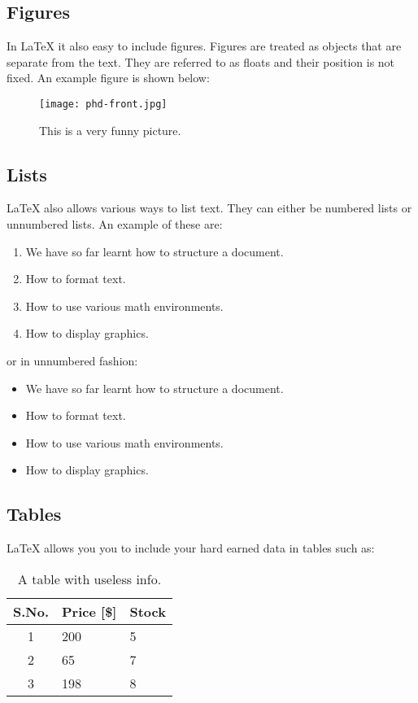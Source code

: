 \documentclass[a4paper,12pt]{article}
\begin{document}
\subsection{Figures}
In \LaTeX{} it also easy to include figures. Figures are treated as objects that are separate from the text. They are referred to as floats and their position is not fixed. An example figure is shown below:
\begin{figure}[htb]
\centering
\texttt{[image: phd-front.jpg]} %
\caption{This is a very funny picture.}
\label{fig:funnypic}
\end{figure}

\subsection{Lists}
\LaTeX{} also allows various ways to list text. They can either be numbered lists or unnumbered lists. An example of these are:
\begin{enumerate}
	\item We have so far learnt how to structure a document.
	\item How to format text.
	\item How to use various math environments.
	\item How to display graphics.
\end{enumerate}
or in unnumbered fashion:
\begin{itemize}
	\item We have so far learnt how to structure a document.
	\item How to format text.
	\item How to use various math environments.
	\item How to display graphics.
\end{itemize}

\newpage
\subsection{Tables}
\LaTeX{} allows you you to include your hard earned data in tables such as:

\begin{table}[htb]
\caption{A table with useless info.}
\label{tab:tab1}
\centering
	\begin{tabular}{c|l|l}
	S.No. & Price [\$] & Stock \\ 	
	\hline
	\hline
	1 & 200 & 5 \\
	2 & 65 & 7 \\
	3 & 198 & 8 \\
	\end{tabular}
\end{table}
\end{document}
